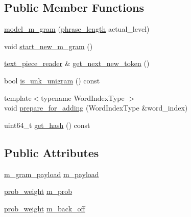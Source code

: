 \subsection*{Public Member Functions}
\begin{DoxyCompactItemize}
\item 
\hyperlink{classuva_1_1smt_1_1bpbd_1_1server_1_1lm_1_1m__grams_1_1model__m__gram_a8a567c654f739ce36458ee07f2f279fd}{model\+\_\+m\+\_\+gram} (\hyperlink{namespaceuva_1_1smt_1_1bpbd_1_1server_af068a19c2e03116caf3e3827a3e40e35}{phrase\+\_\+length} actual\+\_\+level)
\item 
void \hyperlink{classuva_1_1smt_1_1bpbd_1_1server_1_1lm_1_1m__grams_1_1model__m__gram_ad9ee622d6f170d9b149b23f71fe95fdf}{start\+\_\+new\+\_\+m\+\_\+gram} ()
\item 
\hyperlink{classuva_1_1utils_1_1file_1_1text__piece__reader}{text\+\_\+piece\+\_\+reader} \& \hyperlink{classuva_1_1smt_1_1bpbd_1_1server_1_1lm_1_1m__grams_1_1model__m__gram_a60ee2deb3db4eef86abb1ff51caf5d46}{get\+\_\+next\+\_\+new\+\_\+token} ()
\item 
bool \hyperlink{classuva_1_1smt_1_1bpbd_1_1server_1_1lm_1_1m__grams_1_1model__m__gram_ac77c4bc9c53fbdbb9cfcd0f2bdc1d391}{is\+\_\+unk\+\_\+unigram} () const 
\item 
{\footnotesize template$<$typename Word\+Index\+Type $>$ }\\void \hyperlink{classuva_1_1smt_1_1bpbd_1_1server_1_1lm_1_1m__grams_1_1model__m__gram_aa4d16455853e9440de0f54749dcd73fd}{prepare\+\_\+for\+\_\+adding} (Word\+Index\+Type \&word\+\_\+index)
\item 
uint64\+\_\+t \hyperlink{classuva_1_1smt_1_1bpbd_1_1server_1_1lm_1_1m__grams_1_1model__m__gram_a9b5d37949aac6cab2e914d2ba430b5b5}{get\+\_\+hash} () const 
\end{DoxyCompactItemize}
\subsection*{Public Attributes}
\begin{DoxyCompactItemize}
\item 
\hyperlink{namespaceuva_1_1smt_1_1bpbd_1_1server_1_1lm_1_1m__grams_a1422aa6b3f3cb9377916d20e9bf16c0a}{m\+\_\+gram\+\_\+payload} \hyperlink{classuva_1_1smt_1_1bpbd_1_1server_1_1lm_1_1m__grams_1_1model__m__gram_acc7ca63db888d6daa71662c412398ebd}{m\+\_\+payload}
\item 
\hyperlink{namespaceuva_1_1smt_1_1bpbd_1_1server_a01e9ea4de9c226f4464862e84ff0bbcc}{prob\+\_\+weight} \hyperlink{classuva_1_1smt_1_1bpbd_1_1server_1_1lm_1_1m__grams_1_1model__m__gram_a498a480327f996df10727f2986347d5e}{m\+\_\+prob}
\item 
\hyperlink{namespaceuva_1_1smt_1_1bpbd_1_1server_a01e9ea4de9c226f4464862e84ff0bbcc}{prob\+\_\+weight} \hyperlink{classuva_1_1smt_1_1bpbd_1_1server_1_1lm_1_1m__grams_1_1model__m__gram_a83e71902acec0a069af7622360788790}{m\+\_\+back\+\_\+off}
\end{DoxyCompactItemize}

